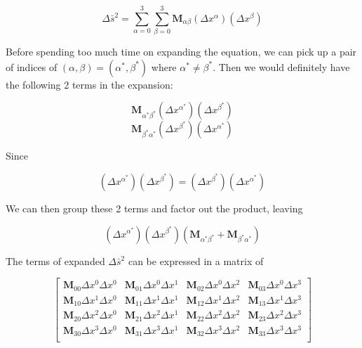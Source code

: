 \begin{tcolorbox}[
    colback=green!5!white,
    colframe=green!75!black,
    colbacktitle=red!30!white,
    enhanced,
    attach boxed title to top center={yshift=-2mm},
    title={
        \parbox{10cm}{
            Why does the equation contains only $\boldsymbol{M}_{\alpha\beta} + \boldsymbol{M}_{\beta\alpha}$ terms when $\alpha \ne \beta$, which guarantees $\boldsymbol{M}_{\alpha\beta} = \boldsymbol{M}_{\beta\alpha}$?
        }
    }]

    \[
        \Delta\bar{s}^2 = \sum_{\alpha = 0}^3\sum_{\beta = 0}^3 \boldsymbol{M}_{\alpha\beta}\left(\Delta x^{\alpha}\right)\left(\Delta x^{\beta}\right)
    \]
\end{tcolorbox}

Before spending too much time on expanding the equation, we can pick up a pair of indices of
$(\alpha, \beta) = (\alpha^*, \beta^*)$ where $\alpha^* \ne \beta^*$. Then we would definitely have the following 2
terms in the expansion:

\[ \boldsymbol{M}_{\alpha^*\beta^*}\left(\Delta x^{\alpha^*}\right)\left(\Delta x^{\beta^*}\right) \]
\[ \boldsymbol{M}_{\beta^*\alpha^*}\left(\Delta x^{\beta^*}\right)\left(\Delta x^{\alpha^*}\right) \]

Since

\[ \left(\Delta x^{\alpha^*}\right)\left(\Delta x^{\beta^*}\right) = \left(\Delta x^{\beta^*}\right)\left(\Delta x^{\alpha^*}\right) \]

We can then group these 2 terms and factor out the product, leaving

\[
    \left(\Delta x^{\alpha^*}\right)\left(\Delta x^{\beta^*}\right)\left( \boldsymbol{M}_{\alpha^*\beta^*} + \boldsymbol{M}_{\beta^*\alpha^*} \right)
\]

The terms of expanded $\Delta\bar{s}^2$ can be expressed in a matrix of

\[
    \renewcommand{\arraystretch}{4}
    \begin{bmatrix}
        \boldsymbol{M}_{00}\Delta x^0\Delta x^0 & \boldsymbol{M}_{01}\Delta x^0\Delta x^1 & \boldsymbol{M}_{02}\Delta x^0\Delta x^2  & \boldsymbol{M}_{03}\Delta x^0\Delta x^3 \\
        \boldsymbol{M}_{10}\Delta x^1\Delta x^0 & \boldsymbol{M}_{11}\Delta x^1\Delta x^1 & \boldsymbol{M}_{12}\Delta x^1\Delta x^2  & \boldsymbol{M}_{13}\Delta x^1\Delta x^3 \\
        \boldsymbol{M}_{20}\Delta x^2\Delta x^0 & \boldsymbol{M}_{21}\Delta x^2\Delta x^1 & \boldsymbol{M}_{22}\Delta x^2\Delta x^2  & \boldsymbol{M}_{23}\Delta x^2\Delta x^3 \\
        \boldsymbol{M}_{30}\Delta x^3\Delta x^0 & \boldsymbol{M}_{31}\Delta x^3\Delta x^1 & \boldsymbol{M}_{32}\Delta x^3\Delta x^2  & \boldsymbol{M}_{33}\Delta x^3\Delta x^3 \\
    \end{bmatrix}
\]

